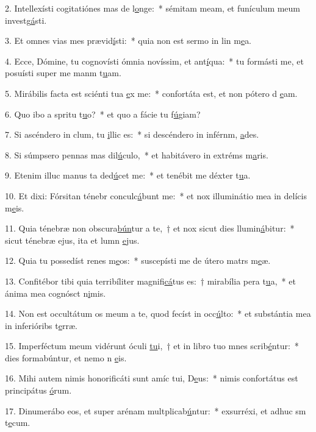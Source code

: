 2. Intellexísti cogitatiónes mas de l\uline{o}nge:~* sémitam meam, et funículum meum investg\uline{á}sti.\par 
3. Et omnes vias mes prævid\uline{í}sti:~* quia non est sermo in lin m\uline{e}a.\par 
4. Ecce, Dómine, tu cognovísti ómnia novíssim, et ant\uline{í}qua:~* tu formásti me, et posuísti super me manm t\uline{u}am.\par 
5. Mirábilis facta est sciénti tua \uline{e}x me:~* confortáta est, et non pótero d \uline{e}am.\par 
6. Quo ibo a spritu t\uline{u}o?~* et quo a fácie tu f\uline{ú}giam?\par 
7. Si ascéndero in clum, tu \uline{i}llic es:~* si descéndero in inférnm, \uline{a}des.\par 
8. Si súmpsero pennas mas dil\uline{ú}culo,~* et habitávero in extréms m\uline{a}ris.\par 
9. Etenim illuc manus ta ded\uline{ú}cet me:~* et tenébit me déxter t\uline{u}a.\par 
10. Et dixi: Fórsitan ténebr conculc\uline{á}bunt me:~* et nox illuminátio mea in delícis m\uline{e}is.\par 
11. Quia ténebræ non obscura\uline{bún}tur a te,~† et nox sicut dies llumin\uline{á}bitur:~* sicut ténebræ ejus, ita et lumn \uline{e}jus.\par 
12. Quia tu possedíst renes m\uline{e}os:~* suscepísti me de útero matrs m\uline{e}æ.\par 
13. Confitébor tibi quia terribíliter magnifi\uline{cá}tus es:~† mirabília pera t\uline{u}a,~* et ánima mea cognósct n\uline{i}mis.\par 
14. Non est occultátum os meum a te, quod fecíst in occ\uline{ú}lto:~* et substántia mea in inferióribs t\uline{e}rræ.\par 
15. Imperféctum meum vidérunt óculi \uline{tu}i,~† et in libro tuo mnes scrib\uline{é}ntur:~* dies formabúntur, et nemo n \uline{e}is.\par 
16. Mihi autem nimis honorificáti sunt amíc tui, D\uline{e}us:~* nimis confortátus est principátus \uline{ó}rum.\par 
17. Dinumerábo eos, et super arénam multplicab\uline{ú}ntur:~* exsurréxi, et adhuc sm t\uline{e}cum.\par 
